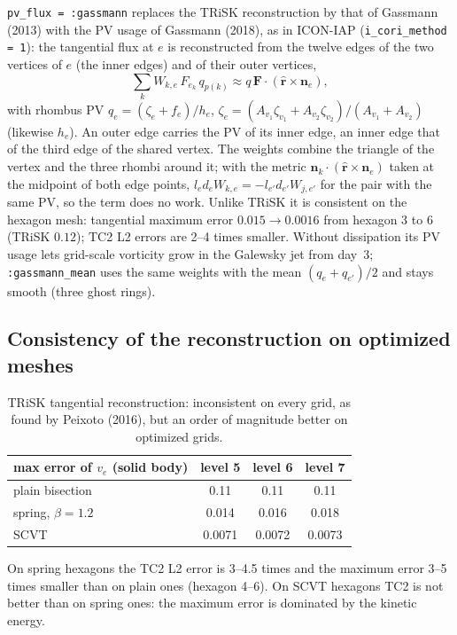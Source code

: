 \documentclass[11pt,a4paper]{article}
\newcommand{\bF}{\mathbf{F}}
\newcommand{\bn}{\mathbf{n}}
\newcommand{\rhat}{\hat{\mathbf{r}}}
\newcommand{\code}[1]{\texttt{#1}}
\begin{document}
\code{pv\_flux = :gassmann} replaces the TRiSK reconstruction by that of Gassmann
(2013) with the PV usage of Gassmann (2018), as in ICON-IAP
(\code{i\_cori\_method = 1}): the tangential flux at $e$ is reconstructed from
the twelve edges of the two vertices of $e$ (the inner edges) and of their outer
vertices,
\[
  \sum_k W_{k,e}\,F_{e_k}\,q_{p(k)} \approx q\,\bF\cdot(\rhat\times\bn_e),
\]
with rhombus PV $q_e = (\zeta_e + f_e)/h_e$,
$\zeta_e = (A_{v_1}\zeta_{v_1}+A_{v_2}\zeta_{v_2})/(A_{v_1}+A_{v_2})$ (likewise $h_e$).
An outer edge carries the PV of its inner edge, an inner edge that of the third
edge of the shared vertex. The weights combine the triangle of the vertex and
the three rhombi around it; with the metric $\bn_k\cdot(\rhat\times\bn_e)$ taken
at the midpoint of both edge points, $l_ed_eW_{k,e} = -l_{e'}d_{e'}W_{j,e'}$ for the
pair with the same PV, so the term does no work. Unlike TRiSK it is consistent on
the hexagon mesh: tangential maximum error $0.015\to0.0016$ from hexagon 3 to 6
(TRiSK $0.12$); TC2 L2 errors are 2--4 times smaller. Without dissipation its PV
usage lets grid-scale vorticity grow in the Galewsky jet from day~3;
\code{:gassmann\_mean} uses the same weights with the mean $(q_e+q_{e'})/2$ and stays
smooth (three ghost rings).

\subsection{Consistency of the reconstruction on optimized meshes}

\begin{table}[ht]
\centering
\begin{tabular}{lccc}
\toprule
max error of $v_e$ (solid body) & level 5 & level 6 & level 7\\
\midrule
plain bisection & 0.11 & 0.11 & 0.11\\
spring, $\beta=1.2$ & 0.014 & 0.016 & 0.018\\
SCVT & 0.0071 & 0.0072 & 0.0073\\
\bottomrule
\end{tabular}
\caption{TRiSK tangential reconstruction: inconsistent on every grid, as found
by Peixoto (2016), but an order of magnitude better on optimized grids.}
\end{table}
On spring hexagons the TC2 L2 error is 3--4.5 times and the maximum error 3--5
times smaller than on plain ones (hexagon 4--6). On SCVT hexagons TC2 is not
better than on spring ones: the maximum error is dominated by the kinetic energy.
\end{document}

